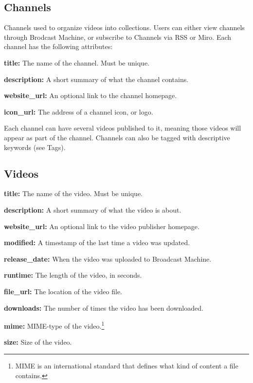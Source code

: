 \documentclass[a4paper,12pt]{report}
\begin{document}
\subsection*{Channels}
Channels used to organize videos into collections. Users can either view channels through Brodcast Machine, or subscribe to Channels via RSS or Miro. Each channel has the following attributes:
\begin{description}
\item{\textbf{title: } The name of the channel. Must be unique.}
\item{\textbf{description: } A short summary of what the channel contains.}
\item{\textbf{website\_url: } An optional link to the channel homepage.}
\item{\textbf{icon\_url: } The address of a channel icon, or logo.} \\
\end{description}
Each channel can have several videos published to it, meaning those videos will appear as part of the channel. Channels can also be tagged with descriptive keywords (see Tags).

\subsection*{Videos}
\begin{description}
\item{\textbf{title: } The name of the video. Must be unique.}
\item{\textbf{description: } A short summary of what the video is about.}
\item{\textbf{website\_url: } An optional link to the video publisher homepage.}
\item{\textbf{modified: } A timestamp of the last time a video was updated.}
\item{\textbf{release\_date: } When the video was uploaded to Broadcast Machine.}
\item{\textbf{runtime: } The length of the video, in seconds.}
\item{\textbf{file\_url: } The location of the video file.}
\item{\textbf{downloads: } The number of times the video has been downloaded.}
\item{\textbf{mime: } MIME-type of the video.\footnote{MIME is an international standard that defines what kind of content a file contains.}}
\item{\textbf{size: } Size of the video.} \\
\end{description}
\end{document}
